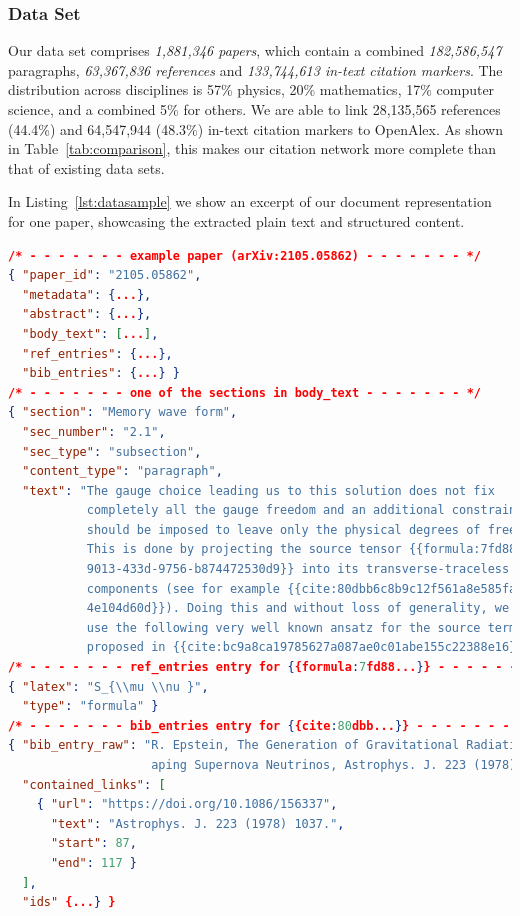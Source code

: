 \subsubsection{Data Set}


Our data set comprises \emph{1,881,346 papers}, which contain a combined \emph{182,586,547} paragraphs, \emph{63,367,836 references} and \emph{133,744,613 in-text citation markers}. The distribution across disciplines is 57\% physics, 20\% mathematics, 17\% computer science, and a combined 5\% for others. %
We are able to link 28,135,565 references (44.4\%) and 64,547,944 (48.3\%) in-text citation markers to OpenAlex. As shown in Table~\ref{tab:comparison}, this makes our citation network more complete than that of existing data sets.

In Listing~\ref{lst:datasample} we show an excerpt of our document representation for one paper, showcasing the extracted plain text and structured content.

\begin{lstlisting}[language=json,caption=Data example.,label=lst:datasample,breaklines=true,captionpos=b,frame=single,showlines=true,basicstyle=\tiny]
/* - - - - - - - example paper (arXiv:2105.05862) - - - - - - - */
{ "paper_id": "2105.05862",
  "metadata": {...},
  "abstract": {...},
  "body_text": [...],
  "ref_entries": {...},
  "bib_entries": {...} }
/* - - - - - - - one of the sections in body_text - - - - - - - */
{ "section": "Memory wave form",
  "sec_number": "2.1",
  "sec_type": "subsection",
  "content_type": "paragraph",
  "text": "The gauge choice leading us to this solution does not fix
           completely all the gauge freedom and an additional constraint
           should be imposed to leave only the physical degrees of freedom.
           This is done by projecting the source tensor {{formula:7fd88bcd-
           9013-433d-9756-b874472530d9}} into its transverse-traceless (TT)
           components (see for example {{cite:80dbb6c8b9c12f561a8e585faceac5f
           4e104d60d}}). Doing this and without loss of generality, we will
           use the following very well known ansatz for the source term
           proposed in {{cite:bc9a8ca19785627a087ae0c01abe155c22388e16}}\n" }
/* - - - - - - - ref_entries entry for {{formula:7fd88...}} - - - - - - - */
{ "latex": "S_{\\mu \\nu }",
  "type": "formula" }
/* - - - - - - - bib_entries entry for {{cite:80dbb...}} - - - - - - - */
{ "bib_entry_raw": "R. Epstein, The Generation of Gravitational Radiation by Esc
                    aping Supernova Neutrinos, Astrophys. J. 223 (1978) 1037.",
  "contained_links": [
    { "url": "https://doi.org/10.1086/156337",
      "text": "Astrophys. J. 223 (1978) 1037.",
      "start": 87,
      "end": 117 }
  ],
  "ids" {...} }
\end{lstlisting}

